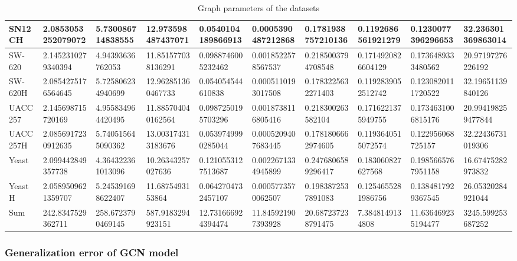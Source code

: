 \documentclass{article}
\begin{document}
\begin{table}[!ht]
\begin{tabular}{|l|l|l|l|l|l|l|l|l|l|}
        SN12CH & 2.0853053252079072 & 5.730086714838555 & 12.973598487437071 & 0.0540104189866913 & 0.0005390487212868 & 0.1781938757210136 & 0.1192686561921279 & 0.1230077396296653 & 32.236301369863014 \\ \hline
        SW-620 & 2.1452310279340394 & 4.94393636762053 & 11.851577038136291 & 0.0988746005232462 & 0.0018522578567537 & 0.2185003794708548 & 0.1714920826604129 & 0.1736489333480562 & 20.97197276226192 \\ \hline
        SW-620H & 2.0854275176564645 & 5.725806234940699 & 12.962851360467733 & 0.054054544610838 & 0.0005110193017508 & 0.1783225632271403 & 0.1192839052512742 & 0.1230820111720522 & 32.19651139840126 \\ \hline
        UACC257 & 2.145698715720169 & 4.955834964420495 & 11.885704040162564 & 0.0987250195703296 & 0.0018738116805416 & 0.218300263582104 & 0.1716221375949755 & 0.1734631006815176 & 20.994198259477844 \\ \hline
        UACC257H & 2.0856917230912635 & 5.740515645090362 & 13.003174313183676 & 0.0539749990285044 & 0.0005209407683445 & 0.1781806662974605 & 0.1193640515072574 & 0.122956068725157 & 32.22436731019306 \\ \hline
        Yeast & 2.099442849357738 & 4.364322361013096 & 10.26343257027636 & 0.1210553127513687 & 0.0022671334945899 & 0.2476806589296417 & 0.183060827627568 & 0.1985665767951158 & 16.67475282973832 \\ \hline
        YeastH & 2.0589509621359707 & 5.245391698622407 & 11.6875493153864 & 0.0642704732457107 & 0.0005773570062507 & 0.1983872537891083 & 0.1254655281986756 & 0.1384817929367545 & 26.05320284921044 \\ \hline
        Sum & 242.8347529362711 & 258.6723790469145 & 587.9183294923151 & 12.731666924394474 & 11.845921907393928 & 20.687237238791475 & 7.3848149134808 & 11.636469235194477 & 3245.599253687252 \\ \hline
    \end{tabular}
    \caption{Graph parameters of the datasets}
\end{table}

\newpage

\subsubsection{Generalization error of GCN model}
\end{document}

